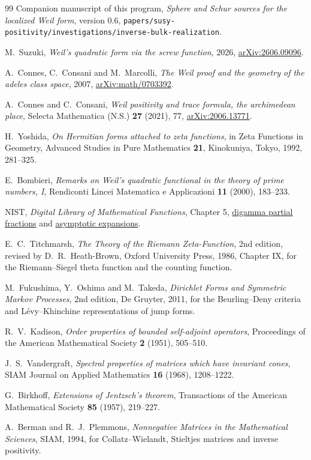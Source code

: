 \begin{thebibliography}{99}
Companion manuscript of this program, \emph{Sphere and Schur sources for the
localized Weil form}, version 0.6,
\texttt{papers/susy-positivity/investigations/inverse-bulk-realization}.

M.~Suzuki, \emph{Weil's quadratic form via the screw function}, 2026,
\href{https://arxiv.org/abs/2606.09096}{arXiv:2606.09096}.

A.~Connes, C.~Consani and M.~Marcolli, \emph{The Weil proof and the geometry of
the adeles class space}, 2007,
\href{https://arxiv.org/abs/math/0703392}{arXiv:math/0703392}.

A.~Connes and C.~Consani, \emph{Weil positivity and trace formula, the
archimedean place}, Selecta Mathematica (N.S.) \textbf{27} (2021), 77,
\href{https://arxiv.org/abs/2006.13771}{arXiv:2006.13771}.

H.~Yoshida, \emph{On Hermitian forms attached to zeta functions}, in Zeta
Functions in Geometry, Advanced Studies in Pure Mathematics \textbf{21},
Kinokuniya, Tokyo, 1992, 281--325.

E.~Bombieri, \emph{Remarks on Weil's quadratic functional in the theory of prime
numbers, I}, Rendiconti Lincei Matematica e Applicazioni \textbf{11} (2000),
183--233.

NIST, \emph{Digital Library of Mathematical Functions}, Chapter 5,
\href{https://dlmf.nist.gov/5.7}{digamma partial fractions} and
\href{https://dlmf.nist.gov/5.11}{asymptotic expansions}.

E.~C.~Titchmarsh, \emph{The Theory of the Riemann Zeta-Function}, 2nd edition,
revised by D.~R.~Heath-Brown, Oxford University Press, 1986, Chapter IX, for the
Riemann--Siegel theta function and the counting function.

M.~Fukushima, Y.~Oshima and M.~Takeda, \emph{Dirichlet Forms and Symmetric
Markov Processes}, 2nd edition, De Gruyter, 2011, for the Beurling--Deny
criteria and L\'evy--Khinchine representations of jump forms.

R.~V.~Kadison, \emph{Order properties of bounded self-adjoint operators},
Proceedings of the American Mathematical Society \textbf{2} (1951), 505--510.

J.~S.~Vandergraft, \emph{Spectral properties of matrices which have invariant
cones}, SIAM Journal on Applied Mathematics \textbf{16} (1968), 1208--1222.

G.~Birkhoff, \emph{Extensions of Jentzsch's theorem}, Transactions of the
American Mathematical Society \textbf{85} (1957), 219--227.

A.~Berman and R.~J.~Plemmons, \emph{Nonnegative Matrices in the Mathematical
Sciences}, SIAM, 1994, for Collatz--Wielandt, Stieltjes matrices and inverse
positivity.
\end{thebibliography}
